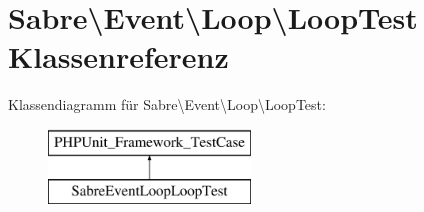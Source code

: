 \hypertarget{class_sabre_1_1_event_1_1_loop_1_1_loop_test}{}\section{Sabre\textbackslash{}Event\textbackslash{}Loop\textbackslash{}Loop\+Test Klassenreferenz}
\label{class_sabre_1_1_event_1_1_loop_1_1_loop_test}
Klassendiagramm für Sabre\textbackslash{}Event\textbackslash{}Loop\textbackslash{}Loop\+Test\+:\begin{figure}[H]
\begin{center}
\leavevmode
\includegraphics[height=2.000000cm]{class_sabre_1_1_event_1_1_loop_1_1_loop_test}
\end{center}
\end{figure}

